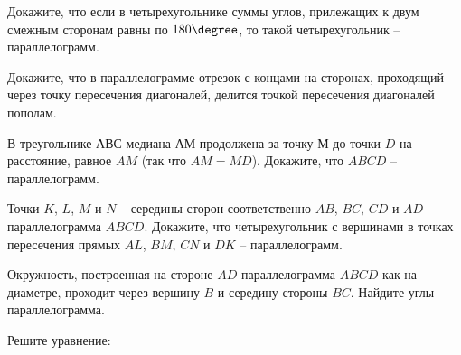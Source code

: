 \begin{class}[number=6]
	\begin{listofex}
		\item Докажите, что если в четырехугольнике суммы углов, прилежащих к двум смежным сторонам равны по \( 180\degree \), то такой четырехугольник -- параллелограмм.
		\item Докажите, что в параллелограмме отрезок с концами на сторонах, проходящий через точку пересечения диагоналей, делится точкой пересечения диагоналей пополам.
		\item В треугольнике \( АВС \) медиана \( АМ \) продолжена за точку \( М \) до точки \( D \) на расстояние, равное \( AM \) (так что \( AM=MD\)). Докажите, что \( ABCD \) -- параллелограмм.
		\item Точки \( K \), \( L \), \( M \) и \( N \) -- середины сторон соответственно \( AB \), \( BC \), \( CD \) и \( AD \) параллелограмма \( ABCD \). Докажите, что четырехугольник с вершинами в точках	пересечения прямых \( AL \), \( BM \), \( CN \) и \( DK \) -- параллелограмм.
		\item Окружность, построенная на стороне \( AD \) параллелограмма \( ABCD \) как на диаметре, проходит через вершину \( B \) и середину стороны \( BC \). Найдите углы параллелограмма.
			\item Решите уравнение:
		\begin{enumcols}[itemcolumns=2]
			\item {}
			\item {}
			\item {}
			\item {}
		\end{enumcols}
	\end{listofex}
\end{class}
%
%
%	
%
%
%	
